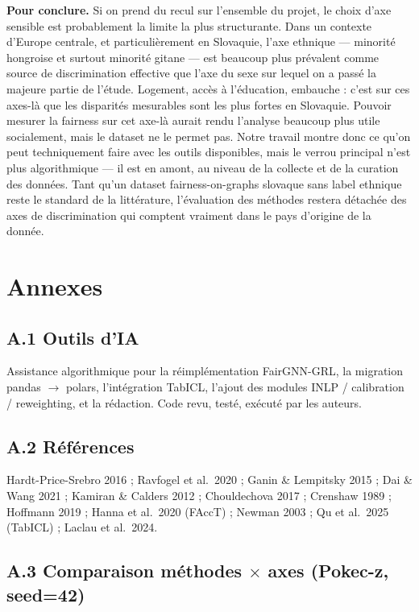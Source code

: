 \documentclass[10pt,a4paper]{article}
\begin{document}
\textbf{Pour conclure.} Si on prend du recul sur l'ensemble du projet, le
choix d'axe sensible est probablement la limite la plus structurante. Dans
un contexte d'Europe centrale, et particulièrement en Slovaquie, l'axe
ethnique — minorité hongroise et surtout minorité gitane — est beaucoup
plus prévalent comme source de discrimination effective que l'axe du sexe
sur lequel on a passé la majeure partie de l'étude. Logement, accès à
l'éducation, embauche : c'est sur ces axes-là que les disparités mesurables
sont les plus fortes en Slovaquie. Pouvoir mesurer la fairness sur cet
axe-là aurait rendu l'analyse beaucoup plus utile socialement, mais le
dataset ne le permet pas. Notre travail montre donc ce qu'on peut
techniquement faire avec les outils disponibles, mais le verrou principal
n'est plus algorithmique — il est en amont, au niveau de la collecte et de
la curation des données. Tant qu'un dataset fairness-on-graphs slovaque sans
label ethnique reste le standard de la littérature, l'évaluation des
méthodes restera détachée des axes de discrimination qui comptent vraiment
dans le pays d'origine de la donnée.

\newpage

\section*{Annexes}

\subsection*{A.1 Outils d'IA}

Assistance algorithmique pour la réimplémentation FairGNN-GRL, la
migration pandas $\to$ polars, l'intégration TabICL, l'ajout des
modules INLP / calibration / reweighting, et la rédaction. Code revu,
testé, exécuté par les auteurs.

\subsection*{A.2 Références}

Hardt-Price-Srebro 2016 ; Ravfogel et al.\ 2020 ; Ganin \& Lempitsky
2015 ; Dai \& Wang 2021 ; Kamiran \& Calders 2012 ; Chouldechova 2017 ;
Crenshaw 1989 ; Hoffmann 2019 ; Hanna et al.\ 2020 (FAccT) ; Newman
2003 ; Qu et al.\ 2025 (TabICL) ; Laclau et al.\ 2024.

\subsection*{A.3 Comparaison méthodes $\times$ axes (Pokec-z, seed=42)}
\end{document}
